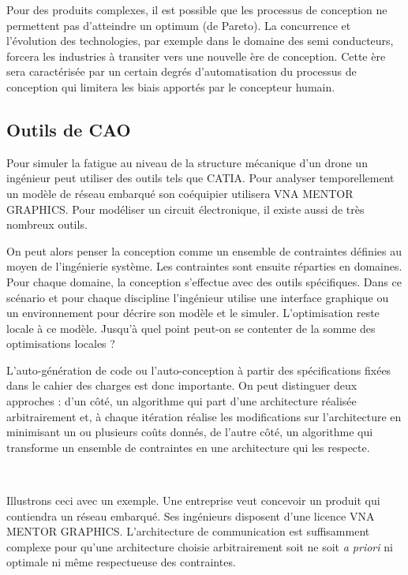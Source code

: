 \documentclass[11pt]{article}
\begin{document}
Pour des produits complexes, il est possible que les processus de conception ne
permettent pas d'atteindre un optimum (de Pareto). La concurrence et l'évolution
des technologies, par exemple dans le domaine des semi conducteurs, forcera les
industries à transiter vers une nouvelle ère de conception. Cette ère sera
caractérisée par un certain degrés d'automatisation du processus de conception
qui limitera les biais apportés par le concepteur humain.

\subsection{Outils de CAO}

Pour simuler la fatigue au niveau de la structure mécanique d'un drone un
ingénieur peut utiliser des outils tels que CATIA. Pour analyser
temporellement un modèle de réseau embarqué son coéquipier utilisera VNA MENTOR
GRAPHICS. Pour modéliser un circuit électronique, il existe aussi de très
nombreux outils.

On peut alors penser la conception comme un ensemble de contraintes définies au
moyen de l'ingénierie système. Les contraintes sont ensuite réparties en
domaines. Pour chaque domaine, la conception s'effectue avec des outils
spécifiques. Dans ce scénario et pour chaque discipline l'ingénieur utilise une
interface graphique ou un environnement pour décrire son modèle et le simuler.
L'optimisation reste locale à ce modèle. Jusqu'à quel point peut-on se contenter
de la somme des optimisations locales ?

L’auto-génération de code ou l’auto-conception à partir des spécifications
fixées dans le cahier des charges est donc importante. On peut distinguer deux
approches : d'un côté, un algorithme qui part d’une architecture réalisée
arbitrairement et, à chaque itération réalise les modifications sur
l’architecture en minimisant un ou plusieurs coûts donnés, de l'autre côté, un
algorithme qui transforme un ensemble de contraintes en une architecture qui
les respecte.

~

Illustrons ceci avec un exemple. Une entreprise veut concevoir un produit qui
contiendra un réseau embarqué. Ses ingénieurs disposent d'une licence VNA MENTOR
GRAPHICS. L'architecture de communication est suffisamment complexe pour qu'une
architecture choisie arbitrairement soit ne soit \textit{a priori} ni optimale
ni même respectueuse des contraintes.
\end{document}
